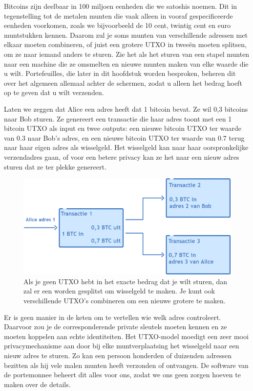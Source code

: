 \documentclass[
  letterpaper,
]{scrbook}
\begin{document}
Bitcoins zijn deelbaar in 100 miljoen eenheden die we satoshis noemen.
Dit in tegenstelling tot de metalen munten die vaak alleen in vooraf
gespecificeerde eenheden voorkomen, zoals we bijvoorbeeld de 10 cent,
twintig cent en euro muntstukken kennen. Daarom zul je soms munten van
verschillende adressen met elkaar moeten combineren, of juist een
grotere UTXO in tweeën moeten splitsen, om ze naar iemand anders te
sturen. Zie het als het sturen van een stapel munten naar een machine
die ze omsmelten en nieuwe munten maken van elke waarde die u wilt.
Portefeuilles, die later in dit hoofdstuk worden besproken, beheren dit
over het algemeen allemaal achter de schermen, zodat u alleen het bedrag
hoeft op te geven dat u wilt verzenden.

Laten we zeggen dat Alice een adres heeft dat 1 bitcoin bevat. Ze wil
0,3 bitcoins naar Bob sturen. Ze genereert een transactie die haar adres
toont met een 1 bitcoin UTXO als input en twee outputs: een nieuwe
bitcoin UTXO ter waarde van 0.3 naar Bob's adres, en een nieuwe bitcoin
UTXO ter waarde van 0.7 terug naar haar eigen adres als wisselgeld. Het
wisselgeld kan naar haar oorspronkelijke verzendadres gaan, of voor een
betere privacy kan ze het naar een nieuw adres sturen dat ze ter plekke
genereert.

\begin{figure}

{\centering \includegraphics{./images/fig14.png}

}

\caption{\label{fig-figuur14}Als je geen UTXO hebt in het exacte bedrag
dat je wilt sturen, dan zal er een worden gesplitst om wisselgeld te
maken. Je kunt ook verschillende UTXO's combineren om een nieuwe grotere
te maken.}

\end{figure}

Er is geen manier in de keten om te vertellen wie welk adres
controleert. Daarvoor zou je de corresponderende private sleutels moeten
kennen en ze moeten koppelen aan echte identiteiten. Het UTXO-model
moedigt een zeer mooi privacymechanisme aan door bij elke
muntverplaatsing het wisselgeld naar een nieuw adres te sturen. Zo kan
een persoon honderden of duizenden adressen bezitten als hij vele malen
munten heeft verzonden of ontvangen. De software van de portemonnee
beheert dit alles voor ons, zodat we ons geen zorgen hoeven te maken
over de details.
\end{document}
